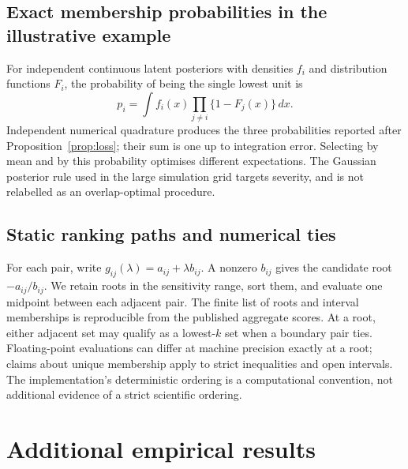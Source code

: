 \documentclass[11pt,letterpaper]{article}
\begin{document}
\subsection{Exact membership probabilities in the illustrative example}
For independent continuous latent posteriors with densities $f_i$ and distribution functions $F_i$, the probability of being the single lowest unit is
\[
 p_i=\int f_i(x)\prod_{j\ne i}\{1-F_j(x)\}\,dx.
\]
Independent numerical quadrature produces the three probabilities reported after Proposition~\ref{prop:loss}; their sum is one up to integration error. Selecting by mean and by this probability optimises different expectations. The Gaussian posterior rule used in the large simulation grid targets severity, and is not relabelled as an overlap-optimal procedure.

\subsection{Static ranking paths and numerical ties}
For each pair, write $g_{ij}(\lambda)=a_{ij}+\lambda b_{ij}$. A nonzero $b_{ij}$ gives the candidate root $-a_{ij}/b_{ij}$. We retain roots in the sensitivity range, sort them, and evaluate one midpoint between each adjacent pair. The finite list of roots and interval memberships is reproducible from the published aggregate scores. At a root, either adjacent set may qualify as a lowest-$k$ set when a boundary pair ties. Floating-point evaluations can differ at machine precision exactly at a root; claims about unique membership apply to strict inequalities and open intervals. The implementation's deterministic ordering is a computational convention, not additional evidence of a strict scientific ordering.

\section{Additional empirical results}\label{app:empirical}
\begin{table}[htbp]
\centering\small\setlength{\tabcolsep}{4pt}

\caption{Harmonised 2025-reweighted historical-panel results. The meaning of metrics and entity-bootstrap intervals is the same as in Table~\ref{tab:vintage}.}
\end{table}
\begin{table}[htbp]
\centering\small
\caption{Development-selected settings using historical vintages. The chosen geometric coefficient zero means that this tuned family selects the latest-score rule. The working ratio is a predictive hyperparameter, not an identified individual response variance.}
\end{table}
\end{document}
